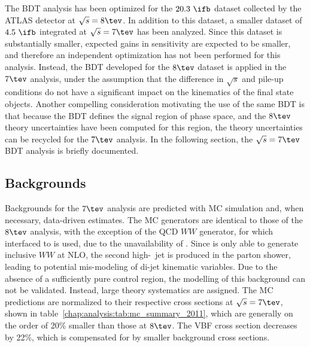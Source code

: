 
The BDT analysis has been optimized for the $20.3~\ifb$ dataset
collected by the ATLAS detector
at $\sqrts = 8 \tev$. In addition to this dataset, a smaller dataset
of $4.5~\ifb$ integrated at $\sqrts = 7 \tev$ has been analyzed. Since
this dataset is substantially smaller, expected gains in sensitivity
are expected to be smaller, and therefore an independent optimization
has not been performed for this analysis. Instead, the BDT developed
for the $8 \tev$ dataset is applied in the $7 \tev$ analysis, under
the assumption that the difference in $\sqrt{s}$ and pile-up conditions do
not have a significant impact on the kinematics of the final state
objects. Another compelling consideration motivating the use of the
same BDT is that because the BDT defines the signal region of phase
space, and the $8 \tev$ theory uncertainties have been computed for
this region, the theory uncertainties can be recycled for the $7 \tev$
analysis. In the following section, the $\sqrts = 7 \tev$ BDT analysis
is briefly documented. 

\subsection{Backgrounds}
\label{chap:analysis:sec:reanalysis:subsec:back}

Backgrounds for the $7 \tev$ analysis are predicted with MC
simulation and, when necessary, data-driven estimates. The MC
generators are identical to those of the $8 \tev$ analysis, with the
exception of the QCD $WW$ generator, for which \POWHEG interfaced to
 is used, due to the unavailability of \SHERPA. Since \POWHEG
is only able to generate inclusive $WW$ at NLO, the second
high-\pt~jet is produced in the parton shower, leading to potential
mis-modeling of di-jet kinematic variables. Due to the absence of a
sufficiently pure \wwtwoj control region, the modelling of this
background can not be validated. Instead, large theory systematics are
assigned. The MC predictions are normalized to their respective cross
sections at $\sqrts = 7 \tev$, shown in
table~\ref{chap:analysis:tab:mc_summary_2011}, which are generally on
the order of 20\% smaller than those at $8 \tev$. The VBF cross
section decreases by 22\%, which is compensated for by smaller
background cross sections. 

